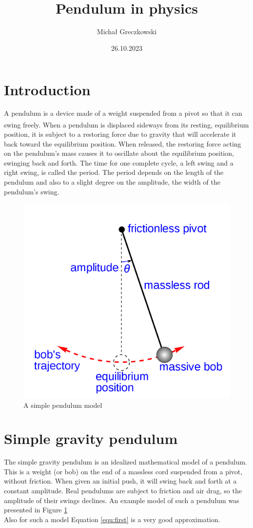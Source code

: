 \documentclass{article}
\title{Pendulum in physics}
\author{Michał Greczkowski}
\date{26.10.2023}
\begin{document}
\maketitle

\tableofcontents

\section{Introduction}
A pendulum is a device made of a weight suspended from a pivot so that it can swing freely. \textsuperscript{\cite{pendulum}} When a pendulum is displaced sideways from its resting, equilibrium position, it is subject to a restoring force due to gravity that will accelerate it back toward the equilibrium position. When released, the restoring force acting on the pendulum's mass causes it to oscillate about the equilibrium position, swinging back and forth. The time for one complete cycle, a left swing and a right swing, is called the period. The period depends on the length of the pendulum and also to a slight degree on the amplitude, the width of the pendulum's swing.
\begin{figure}[h]
 \centering
 \includegraphics[scale=0.3]{pendulum.png}
 \caption{A simple pendulum model}
 \label{fig:pen}
\end{figure}
\section{Simple gravity pendulum}
The simple gravity pendulum is an idealized mathematical model of a pendulum. This is a weight (or bob) on the end of a massless cord suspended from a pivot, without friction. When given an initial push, it will swing back and forth at a constant amplitude. Real pendulums are subject to friction and air drag, so the amplitude of their swings declines.
An example model of such a pendulum was presented in Figure \ref{fig:pen}\\
Also for such a model Equation \ref{equ:first} is a very good approximation.
\newpage
\end{document}
